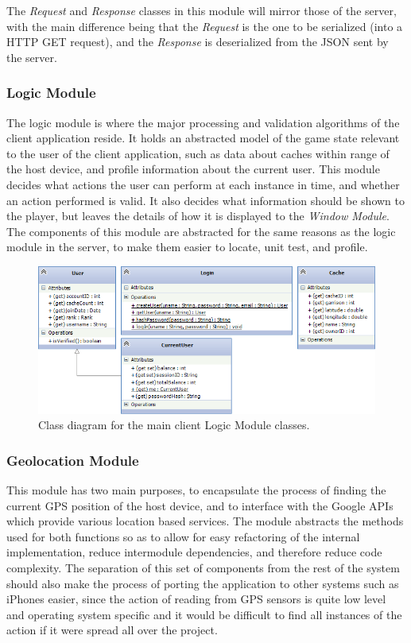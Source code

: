 The \emph{Request} and \emph{Response} classes in this module will mirror those of the server, with the main difference being that the \emph{Request} is the one to be serialized (into a HTTP GET request), and the \emph{Response} is deserialized from the JSON sent by the server.

\subsubsection{Logic Module}
The logic module is where the major processing and validation algorithms of the client application reside. It holds an abstracted model of the game state relevant to the user of the client application, such as data about caches within range of the host device, and profile information about the current user. This module decides what actions the user can perform at each instance in time, and whether an action performed is valid. It also decides what information should be shown to the player, but leaves the details of how it is displayed to the \emph{Window Module}. The components of this module are abstracted for the same reasons as the logic module in the server, to make them easier to locate, unit test, and profile.

\begin{figure}[h!]
    \centering
    \includegraphics[width=\textwidth]{cllogiccd}
    \caption{Class diagram for the main client Logic Module classes.}
\end{figure}

\subsubsection{Geolocation Module}
This module has two main purposes, to encapsulate the process of finding the current GPS position of the host device, and to interface with the Google APIs which provide various location based services. The module abstracts the methods used for both functions so as to allow for easy refactoring of the internal implementation, reduce intermodule dependencies, and therefore reduce code complexity. The separation of this set of components from the rest of the system should also make the process of porting the application to other systems such as iPhones easier, since the action of reading from GPS sensors is quite low level and operating system specific and it would be difficult to find all instances of the action if it were spread all over the project.


